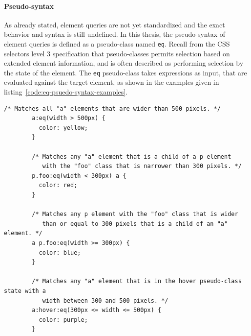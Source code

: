 \documentclass[a4paper,11pt]{kth-mag}
\newcommand{\code}[1]{\texttt{#1}}
\begin{document}
      \paragraph{Pseudo-syntax}
      As already stated, element queries are not yet standardized and the exact behavior and syntax is still undefined.
      In this thesis, the pseudo-syntax of element queries is defined as a pseudo-class named \code{eq}.
      Recall from the \gls{CSS} selectors level 3 specification \cite{w3c_css_selectors} that pseudo-classes permits selection based on extended element information, and is often described as performing selection by the state of the \gls{element}.
      The \code{eq} pseudo-class takes expressions as input, that are evaluated against the target \gls{element}, as shown in the examples given in listing~\ref{code:eq-psuedo-syntax-examples}.
      \begin{lstlisting}[gobble=8,caption={Examples of the element queries psuedo-syntax.}, captionpos=b, label={code:eq-psuedo-syntax-examples}]
        /* Matches all "a" elements that are wider than 500 pixels. */
        a:eq(width > 500px) {
          color: yellow;
        }

        /* Matches any "a" element that is a child of a p element 
           with the "foo" class that is narrower than 300 pixels. */
        p.foo:eq(width < 300px) a {
          color: red;
        }

        /* Matches any p element with the "foo" class that is wider 
           than or equal to 300 pixels that is a child of an "a" element. */
        a p.foo:eq(width >= 300px) {
          color: blue;
        }

        /* Matches any "a" element that is in the hover pseudo-class state with a
           width between 300 and 500 pixels. */
        a:hover:eq(300px <= width <= 500px) {
          color: purple;
        }
      \end{lstlisting}
\end{document}
